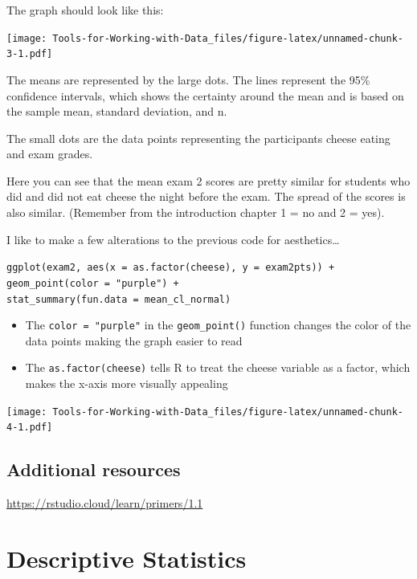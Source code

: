 \documentclass[
]{book}
\providecommand{\tightlist}{%
  \setlength{\itemsep}{0pt}\setlength{\parskip}{0pt}}
\begin{document}
The graph should look like this:

\texttt{[image: Tools-for-Working-with-Data\_files/figure-latex/unnamed-chunk-3-1.pdf]}

The means are represented by the large dots. The lines represent the 95\% confidence intervals, which shows the certainty around the mean and is based on the sample mean, standard deviation, and n.~

The small dots are the data points representing the participants cheese eating and exam grades.

Here you can see that the mean exam 2 scores are pretty similar for students who did and did not eat cheese the night before the exam. The spread of the scores is also similar. (Remember from the introduction chapter 1 = no and 2 = yes).

I like to make a few alterations to the previous code for aesthetics\ldots{}

\texttt{ggplot(exam2,\ aes(x\ =\ as.factor(cheese),\ y\ =\ exam2pts))\ +}\\
\texttt{geom\_point(color\ =\ "purple")\ +}~\\
\texttt{stat\_summary(fun.data\ =\ mean\_cl\_normal)}

\begin{itemize}
\tightlist
\item
  The \texttt{color\ =\ "purple"} in the \texttt{geom\_point()} function changes the color of the data points making the graph easier to read\\
\item
  The \texttt{as.factor(cheese)} tells R to treat the cheese variable as a factor, which makes the x-axis more visually appealing
\end{itemize}

\texttt{[image: Tools-for-Working-with-Data\_files/figure-latex/unnamed-chunk-4-1.pdf]}

\hypertarget{additional-resources}{%
\section{Additional resources}\label{additional-resources}}

\url{https://rstudio.cloud/learn/primers/1.1}

\hypertarget{descriptive-statistics}{%
\chapter{Descriptive Statistics}\label{descriptive-statistics}}
\end{document}
